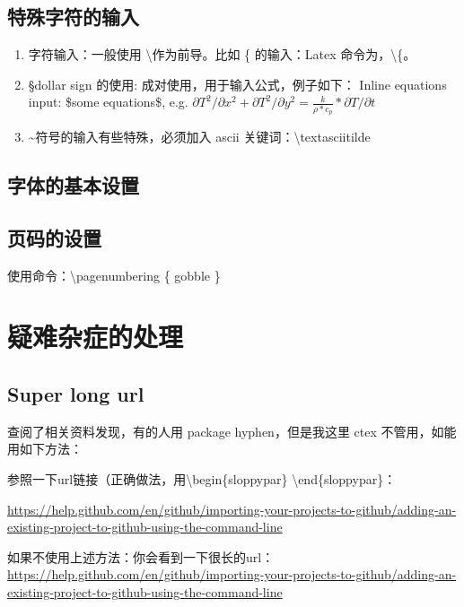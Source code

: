 \documentclass[UTF8,fancyhdr,a4paper]{ctexart}
\begin{document}
\subsection{特殊字符的输入}

\begin{enumerate}
\item
字符输入：一般使用 \textbackslash \space 作为前导。比如 \{ 的输入：Latex 命令为，\textbackslash \{。

\item 
\S \space dollar sign 的使用: 成对使用，用于输入公式，例子如下：
Inline equations input: \$some equations\$, e.g. $\partial T^2/\partial x^2 + \partial T^2/\partial y^2 =\frac{k}{\rho*c_p}*{\partial T/\partial t} $

\item
\textasciitilde 符号的输入有些特殊，必须加入 ascii 关键词：\textbackslash textasciitilde

\end{enumerate}

\subsection{字体的基本设置}



\subsection{页码的设置}
使用命令：\textbackslash pagenumbering \{ gobble \}


\newpage
\section{疑难杂症的处理}
\subsection{Super long url}
查阅了相关资料发现，有的人用 package hyphen，但是我这里 ctex 不管用，如能用如下方法：

参照一下url链接（正确做法，用\textbackslash begin\{sloppypar\} \textbackslash end\{sloppypar\}：\begin{sloppypar}\url{https://help.github.com/en/github/importing-your-projects-to-github/adding-an-existing-project-to-github-using-the-command-line}\end{sloppypar}

如果不使用上述方法：你会看到一下很长的url：\url{https://help.github.com/en/github/importing-your-projects-to-github/adding-an-existing-project-to-github-using-the-command-line}
\end{document}
